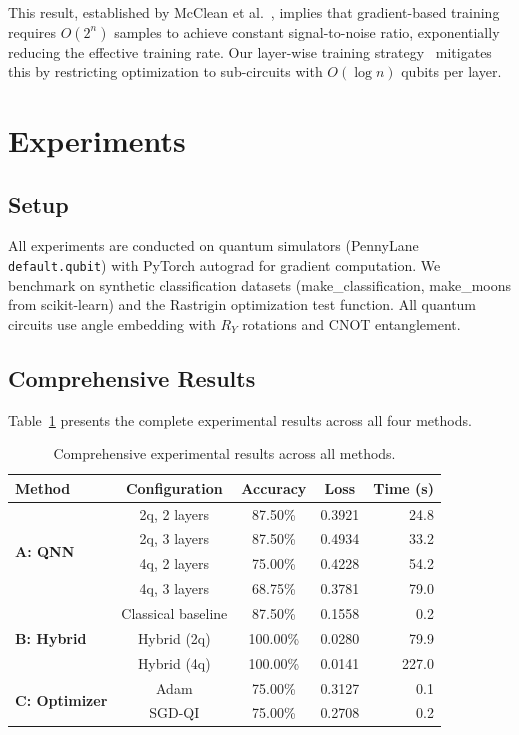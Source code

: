 \documentclass[11pt,a4paper]{article}
\begin{document}
This result, established by McClean et al.~\cite{mcclean2018barren}, implies that gradient-based training requires $O(2^n)$ samples to achieve constant signal-to-noise ratio, exponentially reducing the effective training rate. Our layer-wise training strategy~\cite{mathur2026} mitigates this by restricting optimization to sub-circuits with $O(\log n)$ qubits per layer.

\section{Experiments}

\subsection{Setup}
All experiments are conducted on quantum simulators (PennyLane \texttt{default.qubit}) with PyTorch autograd for gradient computation. We benchmark on synthetic classification datasets (make\_classification, make\_moons from scikit-learn) and the Rastrigin optimization test function. All quantum circuits use angle embedding with $R_Y$ rotations and CNOT entanglement.

\subsection{Comprehensive Results}
Table~\ref{tab:comprehensive} presents the complete experimental results across all four methods.

\begin{table}[h]
\centering
\caption{Comprehensive experimental results across all methods.}
\label{tab:comprehensive}
\begin{tabular}{lcccr}
\toprule
Method & Configuration & Accuracy & Loss & Time (s) \\
\midrule
\multirow{4}{*}{\textbf{A: QNN}} 
& 2q, 2 layers & 87.50\% & 0.3921 & 24.8 \\
& 2q, 3 layers & 87.50\% & 0.4934 & 33.2 \\
& 4q, 2 layers & 75.00\% & 0.4228 & 54.2 \\
& 4q, 3 layers & 68.75\% & 0.3781 & 79.0 \\
\midrule
\multirow{3}{*}{\textbf{B: Hybrid}} 
& Classical baseline & 87.50\% & 0.1558 & 0.2 \\
& Hybrid (2q) & 100.00\% & 0.0280 & 79.9 \\
& Hybrid (4q) & 100.00\% & 0.0141 & 227.0 \\
\midrule
\multirow{2}{*}{\textbf{C: Optimizer}} 
& Adam & 75.00\% & 0.3127 & 0.1 \\
& SGD-QI & 75.00\% & 0.2708 & 0.2 \\
\bottomrule
\end{tabular}
\end{table}
\end{document}
